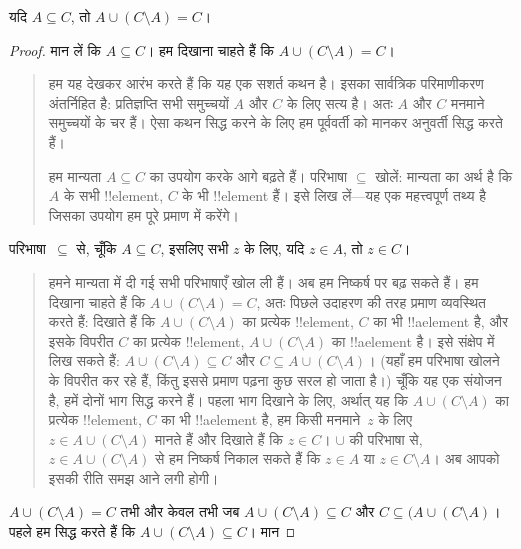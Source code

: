 \documentclass[../../../include/open-logic-section]{subfiles}
\begin{document}


\begin{prop}
यदि $A \subseteq C$, तो $A \cup (C \setminus A) = C$।
\end{prop}  

\begin{proof}
  मान लें कि $A \subseteq C$। हम दिखाना चाहते हैं कि $A \cup (C
  \setminus A) = C$।
  \begin{quote}
    हम यह देखकर आरंभ करते हैं कि यह एक सशर्त कथन है। इसका सार्वत्रिक
    परिमाणीकरण अंतर्निहित है: प्रतिज्ञप्ति सभी समुच्चयों $A$ और $C$ के लिए
    सत्य है। अतः $A$ और $C$ मनमाने समुच्चयों के चर हैं। ऐसा कथन सिद्ध करने
    के लिए हम पूर्ववर्ती को मानकर अनुवर्ती सिद्ध करते हैं।

    हम मान्यता $A \subseteq C$ का उपयोग करके आगे बढ़ते हैं। परिभाषा
    $\subseteq$ खोलें: मान्यता का अर्थ है कि $A$ के सभी !!{element}, $C$
    के भी !!{element} हैं। इसे लिख लें---यह एक महत्त्वपूर्ण तथ्य है जिसका
    उपयोग हम पूरे प्रमाण में करेंगे।
  \end{quote}
  परिभाषा~$\subseteq$ से, चूँकि $A \subseteq C$, इसलिए सभी $z$ के लिए,
  यदि $z \in A$, तो $z \in C$।
  \begin{quote}
    हमने मान्यता में दी गई सभी परिभाषाएँ खोल ली हैं। अब हम निष्कर्ष पर बढ़
    सकते हैं। हम दिखाना चाहते हैं कि $A \cup (C \setminus A) = C$, अतः
    पिछले उदाहरण की तरह प्रमाण व्यवस्थित करते हैं: दिखाते हैं कि $A \cup
    (C \setminus A)$ का प्रत्येक !!{element}, $C$ का भी !!a{element} है,
    और इसके विपरीत $C$ का प्रत्येक !!{element}, $A \cup (C \setminus
    A)$ का !!a{element} है। इसे संक्षेप में लिख सकते हैं: $A \cup (C
    \setminus A) \subseteq C$ और $C \subseteq A \cup (C \setminus A)$।
    (यहाँ हम परिभाषा खोलने के विपरीत कर रहे हैं, किंतु इससे प्रमाण पढ़ना कुछ
    सरल हो जाता है।) चूँकि यह एक संयोजन है, हमें दोनों भाग सिद्ध करने हैं।
    पहला भाग दिखाने के लिए, अर्थात् यह कि $A \cup (C \setminus A)$ का
    प्रत्येक !!{element}, $C$ का भी !!a{element} है, हम किसी मनमाने~$z$
    के लिए $z \in A \cup (C \setminus A)$ मानते हैं और दिखाते हैं कि $z
    \in C$। $\cup$ की परिभाषा से, $z \in A \cup (C \setminus A)$ से हम
    निष्कर्ष निकाल सकते हैं कि $z \in A$ या $z \in C \setminus A$। अब
    आपको इसकी रीति समझ आने लगी होगी।
    \end{quote}
  $A \cup (C \setminus A) = C$ तभी और केवल तभी जब $A \cup (C
  \setminus A) \subseteq C$ और $C \subseteq (A \cup (C \setminus A)$।
  पहले हम सिद्ध करते हैं कि $A \cup (C \setminus A) \subseteq C$। मान

\end{proof}
\end{document}
